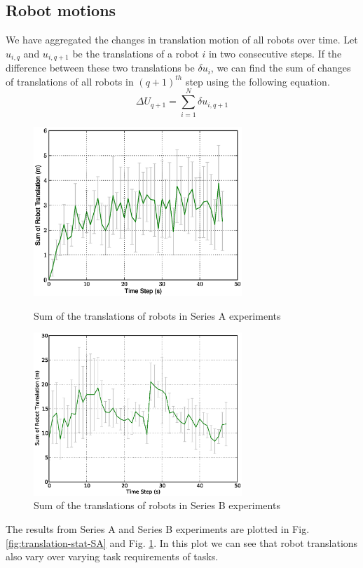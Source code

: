 \documentclass[smallcondensed]{svjour3}
\begin{document}
\subsection*{Robot motions}
We have aggregated the changes in translation motion of all robots over time. Let $u_{i,q}$ and $u_{i,q+1}$ be the translations of a robot $i$ in two consecutive steps. If the difference between these two translations be $\delta u_{i}$, we can find the sum of changes of translations of all robots in $(q+1)^{th}$ step using the following equation.
\begin{equation}
\Delta U_{q+1} = \sum_{i=1}^{N} \delta u_{i, q+1} 
\label{eqn:Delta-Tr}
\end{equation}
\begin{figure}
\centering
\includegraphics[width=0.7\textwidth]{images/global-8robots/8robots-DeltaTranslationStat.eps}
\caption{\small Sum of the translations of robots in Series A experiments}
\label{fig:translation-stat-SA} %
\centering
\includegraphics[width=0.7\textwidth]{images/global/DeltaTranslationStat.eps}
\caption{\small Sum of the translations of robots in Series B experiments}
\label{fig:translation-stat-SB} %
\end{figure}
The results from Series A and Series B experiments are plotted in Fig. \ref{fig:translation-stat-SA} and Fig. \ref{fig:translation-stat-SB}. In this plot we can see that robot translations also vary over varying task requirements of tasks.
\end{document}
